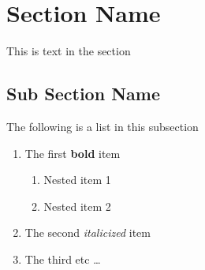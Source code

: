 \section{Section Name}
This is text in the section
\subsection{Sub Section Name}
The following is a list in this subsection
\begin{enumerate}
\item The first \textbf{bold} item
\begin{enumerate}
  \item Nested item 1
  \item Nested item 2
\end{enumerate}
\item The second \textit{italicized} item
\item The third etc \ldots
\end{enumerate}
